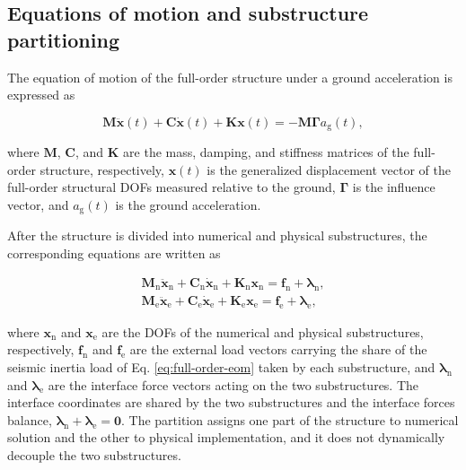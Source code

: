 \documentclass[a4paper,fleqn,review,12pt]{cas-sc}
\numberwithin{equation}{section}
\begin{document}
\subsection{Equations of motion and substructure partitioning}
The equation of motion of the full-order structure under a ground acceleration is expressed as

\vspace{-3.5em}
\begin{equation}
	\mathbf{M}\ddot{\bm{x}}(t)+\mathbf{C}\dot{\bm{x}}(t)+\mathbf{K}\bm{x}(t)
	=-\mathbf{M}\bm{\Gamma}a_{\mathrm{g}}(t),
	\label{eq:full-order-eom}
\end{equation}
\vspace{-3.5em}

\noindent where \(\mathbf{M}\), \(\mathbf{C}\), and \(\mathbf{K}\) are the mass, damping, and stiffness matrices of the full-order structure, respectively, \(\bm{x}(t)\) is the generalized displacement vector of the full-order structural DOFs measured relative to the ground, \(\bm{\Gamma}\) is the influence vector, and \(a_{\mathrm{g}}(t)\) is the ground acceleration.

After the structure is divided into numerical and physical substructures, the corresponding equations are written as

\vspace{-3.5em}
\begin{subequations}
	\label{eq:substructure-eom}
	\begin{align}
		\mathbf{M}_{\mathrm{n}}\ddot{\bm{x}}_{\mathrm{n}}
		+\mathbf{C}_{\mathrm{n}}\dot{\bm{x}}_{\mathrm{n}}
		+\mathbf{K}_{\mathrm{n}}\bm{x}_{\mathrm{n}}
		=\bm{f}_{\mathrm{n}}{}+\bm{\lambda}_{\mathrm{n}},
		\label{eq:numerical-eom}\\
		\mathbf{M}_{\mathrm{e}}\ddot{\bm{x}}_{\mathrm{e}}
		+\mathbf{C}_{\mathrm{e}}\dot{\bm{x}}_{\mathrm{e}}
		+\mathbf{K}_{\mathrm{e}}\bm{x}_{\mathrm{e}}
		=\bm{f}_{\mathrm{e}}{}+\bm{\lambda}_{\mathrm{e}},
		\label{eq:physical-eom}
	\end{align}
\end{subequations}
\vspace{-3.5em}

\noindent where \(\bm{x}_{\mathrm{n}}\) and \(\bm{x}_{\mathrm{e}}\) are the DOFs of the numerical and physical substructures, respectively, \(\bm{f}_{\mathrm{n}}\) and \(\bm{f}_{\mathrm{e}}\) are the external load vectors carrying the share of the seismic inertia load of Eq. \eqref{eq:full-order-eom} taken by each substructure, and \(\bm{\lambda}_{\mathrm{n}}\) and \(\bm{\lambda}_{\mathrm{e}}\) are the interface force vectors acting on the two substructures. The interface coordinates are shared by the two substructures and the interface forces balance, \(\bm{\lambda}_{\mathrm{n}}+\bm{\lambda}_{\mathrm{e}}=\bm{0}\). The partition assigns one part of the structure to numerical solution and the other to physical implementation, and it does not dynamically decouple the two substructures.
\end{document}
